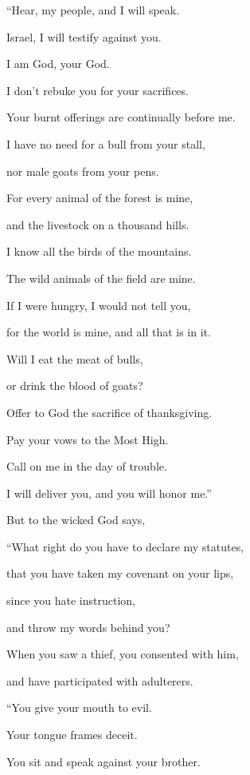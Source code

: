 {\Q {}“Hear, my people, and I will speak.
\par }{\QB Israel, I will testify against you.
\par }{\Q I am God, your God.
\par }{\Q {}I don’t rebuke you for your sacrifices.
\par }{\QB Your burnt offerings are continually before me.
\par }{\Q {}I have no need for a bull from your stall,
\par }{\QB nor male goats from your pens.
\par }{\Q {}For every animal of the forest is mine,
\par }{\QB and the livestock on a thousand hills.
\par }{\Q {}I know all the birds of the mountains.
\par }{\QB The wild animals of the field are mine.
\par }{\Q {}If I were hungry, I would not tell you,
\par }{\QB for the world is mine, and all that is in it.
\par }{\Q {}Will I eat the meat of bulls,
\par }{\QB or drink the blood of goats?
\par }{\Q {}Offer to God the sacrifice of thanksgiving.
\par }{\QB Pay your vows to the Most High.
\par }{\Q {}Call on me in the day of trouble.
\par }{\QB I will deliver you, and you will honor me.”
\par }{\BB \par }{\Q {}But to the wicked God says,
\par }{\QB “What right do you have to declare my statutes,
\par }{\QB that you have taken my covenant on your lips,
\par }{\QB {}since you hate instruction,
\par }{\QB and throw my words behind you?
\par }{\Q {}When you saw a thief, you consented with him,
\par }{\QB and have participated with adulterers.
\par }{\BB \par }{\Q {}“You give your mouth to evil.
\par }{\QB Your tongue frames deceit.
\par }{\Q {}You sit and speak against your brother.
}
